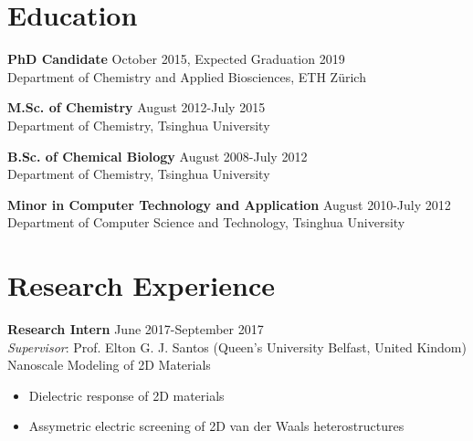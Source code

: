 \documentclass[margin]{res}
\begin{document}


\address{ HCI E120 \\
          Vladimir-Prelog-Weg 1/5 \\
          ETH Z\"{u}rich, CH-8093, Z\"{u}rich, Switzerland \\
          +41-44-63-37330 \\
          Mail: tian.tian@chem.ethz.ch}
\address{{} \\  \\  \\
        }

\begin{resume}


\section{Education}

\textbf{PhD Candidate} \hfill October 2015, Expected Graduation 2019\\
Department of Chemistry and Applied Biosciences, ETH Z\"{u}rich

\textbf{M.Sc. of Chemistry}  \hfill August 2012-July 2015\\
Department of Chemistry, Tsinghua University

\textbf{B.Sc. of Chemical Biology}  \hfill August 2008-July 2012\\
Department of Chemistry, Tsinghua University

\textbf{Minor in Computer Technology and Application}  \hfill August 2010-July 2012\\
Department of Computer Science and Technology, Tsinghua University

\section{Research Experience}

\textbf{Research Intern} \hfill June 2017-September 2017\\
\textit{Supervisor}: Prof. Elton G. J. Santos (Queen's University Belfast, United Kindom)\\
Nanoscale Modeling of 2D Materials
\begin{itemize} \itemsep -2pt
\item Dielectric response of 2D materials
\item Assymetric electric screening of 2D van der Waals heterostructures
\end{itemize}



\end{resume}
\end{document}
